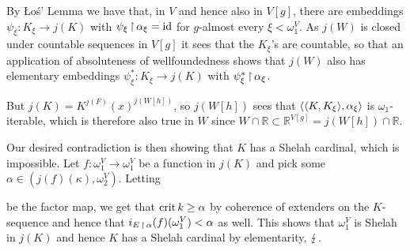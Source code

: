 \documentclass[../../main]{subfiles}
\begin{document}
{{    By \L o\' s' Lemma we have that, in $V$ and hence also in $V[g]$, there are embeddings $\psi_\xi:K_\xi\to j(K)$ with $\psi_\xi\operatorname{\upharpoonright}\alpha_\xi=\operatorname{id}$ for $g$-almost every $\xi<\omega_1^V$. As $j(W)$ is closed under countable sequences in $V[g]$ it sees that the $K_\xi$'s are countable, so that an application of absoluteness of wellfoundedness  shows that $j(W)$ also has elementary embeddings $\psi^*_\xi:K_\xi\to j(K)$ with $\psi^*_\xi\operatorname{\upharpoonright}\alpha_\xi$.

    \qquad But $j(K)=K^{j(F)}(x)^{j(W[h])}$, so $j(W[h])$ sees that $\langle \langle K,K_\xi\rangle,\alpha_\xi\rangle$ is $\omega_1$-iterable, which is therefore also true in $W$ since $W\cap\mathbb R\subset\mathbb R^{V[g]}=j(W[h])\cap\mathbb R$.
  }

  Our desired contradiction is then showing that $K$ has a Shelah cardinal, which is impossible. Let $f:\omega_1^V\to\omega_1^V$ be a function in $j(K)$ and pick some $\alpha\in(j(f)(\kappa),\omega_2^V)$. Letting

  be the factor map, we get that $\operatorname{crit} k\geq\alpha$ by coherence of extenders on the $K$-sequence and hence that $i_{E\operatorname{\upharpoonright}\alpha}(f)(\omega_1^V)<\alpha$ as well. This shows that $\omega_1^V$ is Shelah in $j(K)$ and hence $K$ has a Shelah cardinal by elementarity, $\operatorname{\lightning}$.
}

\end{document}
